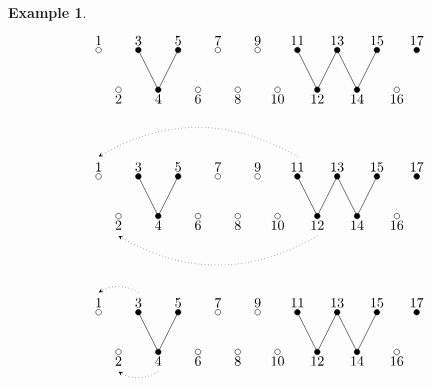 \documentclass{amsart}
\newtheorem{example}[theorem]{Example}
\numberwithin{equation}{section}
\begin{document}
\begin{example}
\[\begin{tikzpicture}
        \foreach \i in {3,5,11,13,15,17}{
          \draw[fill=black] (0.5*\i,1) circle (2pt);
          \node[above] at (0.5*\i,1) {\i};} 
        \foreach \i in {1,7,9}{
          \draw[fill=white] (0.5*\i,1) circle (2pt);
          \node[above] at (0.5*\i,1) {\i};} 
        \foreach \i in {4,12,14}{
          \draw[fill=black] (0.5*\i,0) circle (2pt);
          \draw (0.5*\i,0) -- (0.5*\i-0.5,1);
          \draw (0.5*\i,0) -- (0.5*\i+0.5,1);
          \node[below] at (0.5*\i,0) {\i};} 
        \foreach \i in {2,6,8,10,16}{
          \draw[fill=white] (0.5*\i,0) circle (2pt);
          \node[below] at (0.5*\i,0) {\i};} 
      \end{tikzpicture}
    \]
    \[
      \begin{tikzpicture}
        \draw[dotted,-stealth] (5.5,1.5) to[out=150,in=30] (0.5,1.5);
        \draw[dotted,-stealth] (6,-0.5) to[out=210,in=-30] (1,-0.5);
        \foreach \i in {3,5,11,13,15,17}{
          \draw[fill=black] (0.5*\i,1) circle (2pt);
          \node[above] at (0.5*\i,1) {\i};} 
        \foreach \i in {1,7,9}{
          \draw[fill=white] (0.5*\i,1) circle (2pt);
          \node[above] at (0.5*\i,1) {\i};} 
        \foreach \i in {4,12,14}{
          \draw[fill=black] (0.5*\i,0) circle (2pt);
          \draw (0.5*\i,0) -- (0.5*\i-0.5,1);
          \draw (0.5*\i,0) -- (0.5*\i+0.5,1);
          \node[below] at (0.5*\i,0) {\i};} 
        \foreach \i in {2,6,8,10,16}{
          \draw[fill=white] (0.5*\i,0) circle (2pt);
          \node[below] at (0.5*\i,0) {\i};} 
      \end{tikzpicture}
    \]
    \[
      \begin{tikzpicture}
        \draw[dotted,-stealth] (1.5,1.5) to[out=150,in=30] (0.5,1.5);
        \draw[dotted,-stealth] (2,-0.5) to[out=210,in=-30] (1,-0.5);
        \foreach \i in {3,5,11,13,15,17}{
          \draw[fill=black] (0.5*\i,1) circle (2pt);
          \node[above] at (0.5*\i,1) {\i};} 
        \foreach \i in {1,7,9}{
          \draw[fill=white] (0.5*\i,1) circle (2pt);
          \node[above] at (0.5*\i,1) {\i};} 
        \foreach \i in {4,12,14}{
          \draw[fill=black] (0.5*\i,0) circle (2pt);
          \draw (0.5*\i,0) -- (0.5*\i-0.5,1);
          \draw (0.5*\i,0) -- (0.5*\i+0.5,1);
          \node[below] at (0.5*\i,0) {\i};} 
        \foreach \i in {2,6,8,10,16}{
          \draw[fill=white] (0.5*\i,0) circle (2pt);
          \node[below] at (0.5*\i,0) {\i};} 
      \end{tikzpicture}
    \]

  \end{example}
\end{document}
